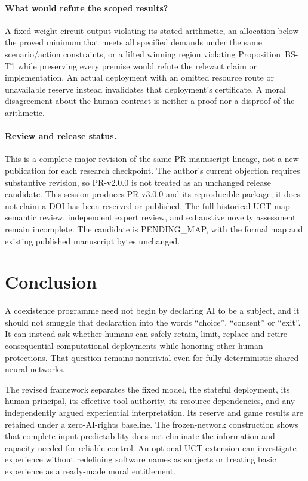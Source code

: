 \paragraph{What would refute the scoped results?}
A fixed-weight circuit output violating its stated arithmetic, an allocation below the proved minimum that meets all specified demands under the same scenario/action constraints, or a lifted winning region violating Proposition~BS-T1 while preserving every premise would refute the relevant claim or implementation. An actual deployment with an omitted resource route or unavailable reserve instead invalidates that deployment's certificate. A moral disagreement about the human contract is neither a proof nor a disproof of the arithmetic.

\paragraph{Review and release status.}
This is a complete major revision of the same PR manuscript lineage, not a new publication for each research checkpoint. The author's current objection requires substantive revision, so PR-v2.0.0 is not treated as an unchanged release candidate. This session produces PR-v3.0.0 and its reproducible package; it does not claim a DOI has been reserved or published. The full historical UCT-map semantic review, independent expert review, and exhaustive novelty assessment remain incomplete. The candidate is PENDING\_MAP, with the formal map and existing published manuscript bytes unchanged.

\section{Conclusion}
A coexistence programme need not begin by declaring AI to be a subject, and it should not smuggle that declaration into the words ``choice'', ``consent'' or ``exit''. It can instead ask whether humans can safely retain, limit, replace and retire consequential computational deployments while honoring other human protections. That question remains nontrivial even for fully deterministic shared neural networks.

The revised framework separates the fixed model, the stateful deployment, its human principal, its effective tool authority, its resource dependencies, and any independently argued experiential interpretation. Its reserve and game results are retained under a zero-AI-rights baseline. The frozen-network construction shows that complete-input predictability does not eliminate the information and capacity needed for reliable control. An optional UCT extension can investigate experience without redefining software names as subjects or treating basic experience as a ready-made moral entitlement.

